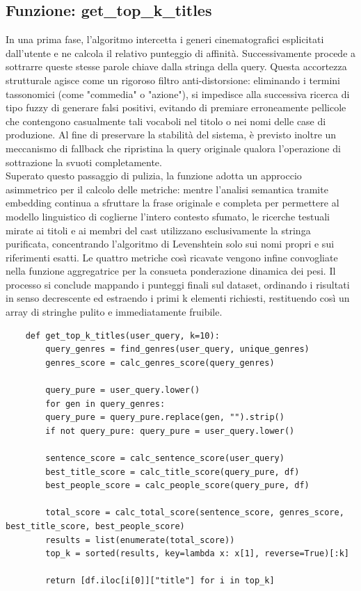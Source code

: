 \documentclass{article}
\begin{document}
\subsection{Funzione: get\_top\_k\_titles}
In una prima fase, l'algoritmo intercetta i generi cinematografici esplicitati dall'utente e ne calcola il relativo punteggio di affinit\`a. Successivamente procede a sottrarre queste stesse parole chiave dalla stringa della query. Questa accortezza strutturale agisce come un rigoroso filtro anti-distorsione: eliminando i termini tassonomici (come "commedia" o "azione"), si impedisce alla successiva ricerca di tipo fuzzy di generare falsi positivi, evitando di premiare erroneamente pellicole che contengono casualmente tali vocaboli nel titolo o nei nomi delle case di produzione. Al fine di preservare la stabilit\`a del sistema, \`e previsto inoltre un meccanismo di fallback che ripristina la query originale qualora l'operazione di sottrazione la svuoti completamente.\\
Superato questo passaggio di pulizia, la funzione adotta un approccio asimmetrico per il calcolo delle metriche: mentre l'analisi semantica tramite embedding continua a sfruttare la frase originale e completa per permettere al modello linguistico di coglierne l'intero contesto sfumato, le ricerche testuali mirate ai titoli e ai membri del cast utilizzano esclusivamente la stringa purificata, concentrando l'algoritmo di Levenshtein solo sui nomi propri e sui riferimenti esatti. Le quattro metriche cos\`i ricavate vengono infine convogliate nella funzione aggregatrice per la consueta ponderazione dinamica dei pesi. Il processo si conclude mappando i punteggi finali sul dataset, ordinando i risultati in senso decrescente ed estraendo i primi k elementi richiesti, restituendo cos\`i un array di stringhe pulito e immediatamente fruibile.
\begin{lstlisting}
	def get_top_k_titles(user_query, k=10):
		query_genres = find_genres(user_query, unique_genres)
		genres_score = calc_genres_score(query_genres)
		
		query_pure = user_query.lower()
		for gen in query_genres:
		query_pure = query_pure.replace(gen, "").strip()
		if not query_pure: query_pure = user_query.lower()
		
		sentence_score = calc_sentence_score(user_query)
		best_title_score = calc_title_score(query_pure, df)
		best_people_score = calc_people_score(query_pure, df)
		
		total_score = calc_total_score(sentence_score, genres_score, best_title_score, best_people_score)
		results = list(enumerate(total_score))
		top_k = sorted(results, key=lambda x: x[1], reverse=True)[:k]
		
		return [df.iloc[i[0]]["title"] for i in top_k]
\end{lstlisting}
\end{document}
